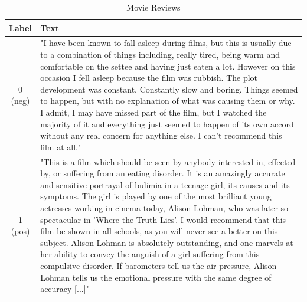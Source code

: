 \documentclass[12pt,a4paper]{report}
\begin{document}
\begin{table}[h!]
  \centering
  \begin{tabular}{|c|p{12cm}|}
    \hline
    \textbf{Label} & \textbf{Text}                                                                                                                                                                                                                                                                                                                                                                                                                                                                                                                                                                                                                                                                                                                                                                             \\
    \hline
    0 (neg)        & "I have been known to fall asleep during films, but this is usually due to a combination of things including, really tired, being warm and comfortable on the settee and having just eaten a lot. However on this occasion I fell asleep because the film was rubbish. The plot development was constant. Constantly slow and boring. Things seemed to happen, but with no explanation of what was causing them or why. I admit, I may have missed part of the film, but I watched the majority of it and everything just seemed to happen of its own accord without any real concern for anything else. I can't recommend this film at all."                                                                                                                                             \\
    \hline
    1 (pos)        & "This is a film which should be seen by anybody interested in, effected by, or suffering from an eating disorder. It is an amazingly accurate and sensitive portrayal of bulimia in a teenage girl, its causes and its symptoms. The girl is played by one of the most brilliant young actresses working in cinema today, Alison Lohman, who was later so spectacular in 'Where the Truth Lies'. I would recommend that this film be shown in all schools, as you will never see a better on this subject. Alison Lohman is absolutely outstanding, and one marvels at her ability to convey the anguish of a girl suffering from this compulsive disorder. If barometers tell us the air pressure, Alison Lohman tells us the emotional pressure with the same degree of accuracy [...]" \\
    \hline
  \end{tabular}
  \caption{Movie Reviews\protect\footnotemark}
  \label{table:negative_reviews}
\end{table}
\end{document}
